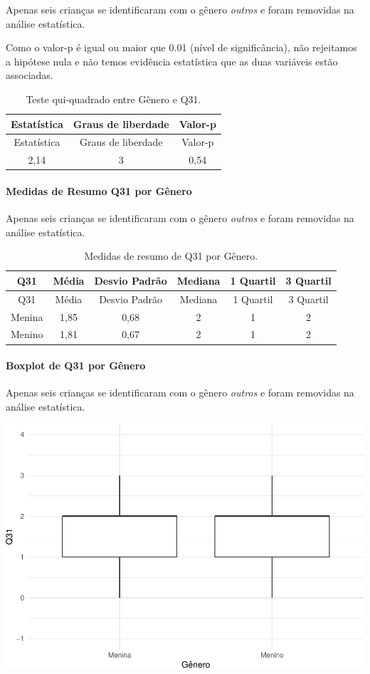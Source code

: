 \documentclass[]{article}
\let\oldparagraph\paragraph
\renewcommand{\paragraph}[1]{\oldparagraph{#1}\mbox{}}
\begin{document}
Apenas seis crianças se identificaram com o gênero \emph{outros} e foram removidas na análise estatística.

Como o valor-p é igual ou maior que 0.01 (nível de significância), não rejeitamos a hipótese nula e não temos evidência estatística que as duas variáveis estão associadas.

\begin{longtable}[]{@{}ccc@{}}
\caption{\label{tab:unnamed-chunk-1028}Teste qui-quadrado entre Gênero e Q31.}\tabularnewline
\toprule
Estatística & Graus de liberdade & Valor-p\tabularnewline
\midrule
\endfirsthead
\toprule
Estatística & Graus de liberdade & Valor-p\tabularnewline
\midrule
\endhead
2,14 & 3 & 0,54\tabularnewline
\bottomrule
\end{longtable}

\cleardoublepage

\hypertarget{medidas-de-resumo-q31-por-guxeanero}{%
\paragraph{Medidas de Resumo Q31 por Gênero}\label{medidas-de-resumo-q31-por-guxeanero}}

Apenas seis crianças se identificaram com o gênero \emph{outros} e foram removidas na análise estatística.

\begin{longtable}[]{@{}cccccc@{}}
\caption{\label{tab:unnamed-chunk-1029}Medidas de resumo de Q31 por Gênero.}\tabularnewline
\toprule
Q31 & Média & Desvio Padrão & Mediana & 1 Quartil & 3 Quartil\tabularnewline
\midrule
\endfirsthead
\toprule
Q31 & Média & Desvio Padrão & Mediana & 1 Quartil & 3 Quartil\tabularnewline
\midrule
\endhead
Menina & 1,85 & 0,68 & 2 & 1 & 2\tabularnewline
Menino & 1,81 & 0,67 & 2 & 1 & 2\tabularnewline
\bottomrule
\end{longtable}

\hypertarget{boxplot-de-q31-por-guxeanero}{%
\paragraph{Boxplot de Q31 por Gênero}\label{boxplot-de-q31-por-guxeanero}}

Apenas seis crianças se identificaram com o gênero \emph{outros} e foram removidas na análise estatística.

\begin{center}\includegraphics[width=0.75\linewidth]{relatorio_covid19_files/figure-latex/unnamed-chunk-1030-1} \end{center}
\end{document}
